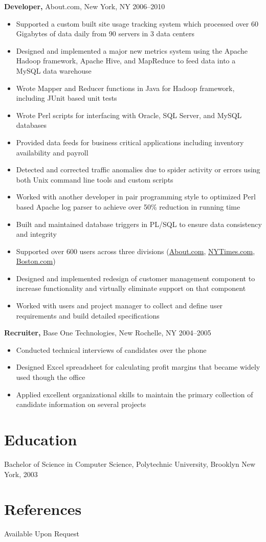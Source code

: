 \documentclass[margin]{res}
\begin{document}
\begin{resume}
{\bf Developer,} About.com, New York, NY \hfill  2006--2010
\begin{itemize}
  \item Supported a custom built site usage tracking system which processed
    over 60 Gigabytes of data daily from 90 servers in 3 data centers
  \item Designed and implemented a major new metrics system using the Apache
    Hadoop framework, Apache Hive, and MapReduce to feed data into a MySQL data
    warehouse
  \item Wrote Mapper and Reducer functions in Java for Hadoop framework,
    including JUnit based unit tests
  \item Wrote Perl scripts for interfacing with Oracle, SQL Server, and
    MySQL databases
  \item Provided data feeds for business critical applications including
    inventory availability and payroll
  \item Detected and corrected traffic anomalies due to spider activity or
    errors using both Unix command line tools and custom scripts
  \item Worked with another developer in pair programming style to optimized
    Perl based Apache log parser to achieve over 50\% reduction in running time
  \item Built and maintained database triggers in PL/SQL to ensure data
    consistency and integrity
  \item Supported over 600 users across three divisions
    (\href{http://www.about.com}{About.com},
    \href{http://www.nytimes.com}{NYTimes.com},
    \href{http://www.boston.com}{Boston.com})
  \item Designed and implemented redesign of customer management component to
    increase functionality and virtually eliminate support on that component
  \item Worked with users and project manager to collect and define user
    requirements and build detailed specifications
\end{itemize}

{\bf Recruiter,} Base One Technologies, New Rochelle, NY \hfill 2004--2005
\begin{itemize}
  \item Conducted technical interviews of candidates over the phone
  \item Designed Excel spreadsheet for calculating profit margins that became
    widely used though the office
  \item Applied excellent organizational skills to maintain the primary
    collection of candidate information on several projects
\end{itemize}

\section{Education}
Bachelor of Science in Computer Science, Polytechnic University, Brooklyn New
York, 2003

\section{References}
Available Upon Request

\end{resume}
\end{document}
